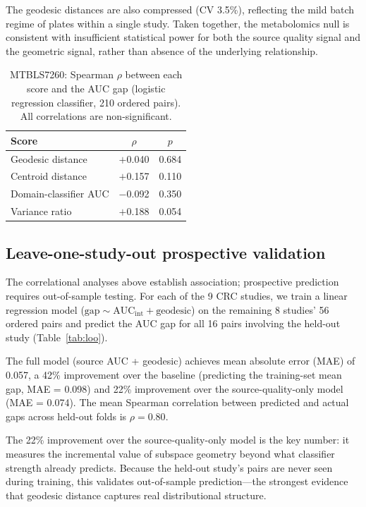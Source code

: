 \documentclass{article}
\begin{document}
The geodesic distances are also compressed (CV 3.5\%), reflecting the mild batch regime of plates within a single study. Taken together, the metabolomics null is consistent with insufficient statistical power for both the source quality signal and the geometric signal, rather than absence of the underlying relationship.

\begin{table}[t]
\centering
\caption{MTBLS7260: Spearman $\rho$ between each score and the AUC gap (logistic regression classifier, 210 ordered pairs). All correlations are non-significant.}
\label{tab:baselines_metab}
\begin{tabular}{lcc}
\toprule
Score & $\rho$ & $p$ \\
\midrule
Geodesic distance     & $+$0.040 & 0.684 \\
Centroid distance     & $+$0.157 & 0.110 \\
Domain-classifier AUC & $-$0.092 & 0.350 \\
Variance ratio        & $+$0.188 & 0.054 \\
\bottomrule
\end{tabular}
\end{table}


\subsection{Leave-one-study-out prospective validation}
\label{sec:loo}

The correlational analyses above establish association; prospective prediction requires out-of-sample testing. For each of the 9 CRC studies, we train a linear regression model ($\text{gap} \sim \text{AUC}_{\mathrm{int}} + \text{geodesic}$) on the remaining 8 studies' 56 ordered pairs and predict the AUC gap for all 16 pairs involving the held-out study (Table~\ref{tab:loo}).

The full model (source AUC + geodesic) achieves mean absolute error (MAE) of 0.057, a 42\% improvement over the baseline (predicting the training-set mean gap, MAE = 0.098) and 22\% improvement over the source-quality-only model (MAE = 0.074). The mean Spearman correlation between predicted and actual gaps across held-out folds is $\rho = 0.80$.

The 22\% improvement over the source-quality-only model is the key number: it measures the incremental value of subspace geometry beyond what classifier strength already predicts. Because the held-out study's pairs are never seen during training, this validates out-of-sample prediction---the strongest evidence that geodesic distance captures real distributional structure.
\end{document}
